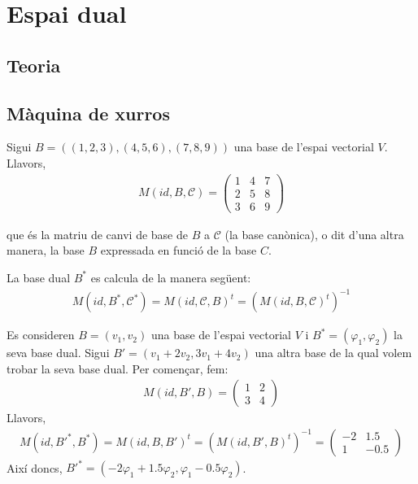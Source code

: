 \section{Espai dual}
\subsection{Teoria}

\subsection{Màquina de xurros}
\begin{example}
Sigui $B=((1,2,3),(4,5,6),(7,8,9))$ una base de l'espai vectorial $V$. Llavors,
    \begin{align*}
        M(id, B, \mathcal{C}) = \begin{pmatrix} 1 & 4 & 7 \\ 2 & 5 & 8 \\ 3 & 6 & 9 \end{pmatrix}
    \end{align*}

que és la matriu de canvi de base de $B$ a $\mathcal{C}$ (la base canònica), o dit d'una altra manera, la base $B$ expressada en funció de la base $C$.

La base dual $B^{\ast}$ es calcula de la manera següent:
\begin{align*}
M(id, B^{\ast}, \mathcal{C}^{\ast}) = M(id, \mathcal{C}, B)^{t} = (M(id, B, \mathcal{C})^{t})^{-1}
\end{align*}
\end{example}

\begin{example}
Es consideren $B = (v_{1}, v_{2})$ una base de l'espai vectorial $V$ i $B^{\ast} = (\varphi_{1}, \varphi_{2})$ la seva base dual. Sigui $B' = (v_{1}+2 v_{2}, 3 v_{1} + 4 v_{2})$ una altra base de la qual volem trobar la seva base dual. Per començar, fem:
    \begin{align*}
        M(id, B', B) = \begin{pmatrix} 1 & 2 \\ 3 & 4 \end{pmatrix}
    \end{align*}
Llavors,
\begin{align*}
M(id, B'^{\ast}, B^{\ast}) = M(id, B, B')^{t} = (M(id, B', B)^{t})^{-1} = \begin{pmatrix} -2 & 1.5 \\ 1 & -0.5 \end{pmatrix}
\end{align*}
Així doncs, $B'^{\ast} = (-2 \varphi_{1} + 1.5 \varphi_{2}, \varphi_{1} - 0.5 \varphi_{2})$.
\end{example}
